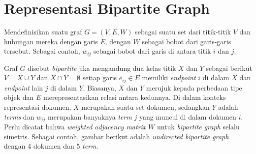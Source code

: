 


\section{Representasi Bipartite Graph}

Mendefinisikan suatu graf \(G = (V, E, W)\) sebagai suatu set dari titik-titik \(V\) dan hubungan mereka dengan garis \(E\), dengan \(W\) sebagai bobot dari garis-garis tersebut. Sebagai contoh, \(w_{ij}\) sebagai bobot dari garis di antara titik \(i\) dan \(j\).

Graf $G$ disebut \textit{bipartite} jika mengandung dua kelas titik $X$ dan $Y$ sebagai berikut $V = X \cup Y$ dan $X \cap Y = \emptyset$ setiap garis $e_{ij} \in E$ memiliki \textit{endpoint} $i$ di dalam $X$ dan \textit{endpoint} lain $j$ di dalam $Y$. Biasanya, $X$ dan $Y$ merujuk kepada perbedaan tipe objek dan $E$ merepresentasikan relasi antara keduanya. Di dalam konteks representasi dokumen, $X$ merupakan suatu set dokumen, sedangkan $Y$ adalah \textit{terms} dan $w_{ij}$ merupakan banyaknya \textit{term} $j$ yang muncul di dalam dokumen $i$. Perlu dicatat bahwa \textit{weighted adjacency matrix} $W$ untuk \textit{bipartite graph} selalu simetris. Sebagai contoh, gambar berikut adalah \textit{undirected bipartite graph} dengan 4 dokumen dan 5 \textit{term}.

